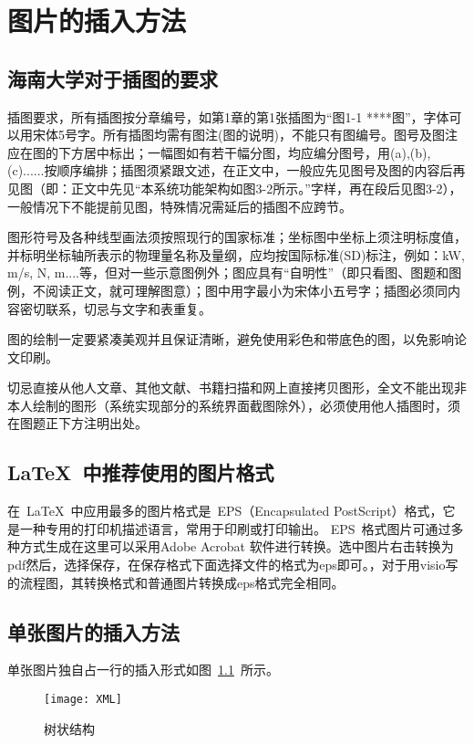 
\chapter{图片的插入方法}

\section{海南大学对于插图的要求}

 \par{插图要求，所有插图按分章编号，如第1章的第1张插图为“图1-1 ****图”，字体可以用宋体5号字。所有插图均需有图注(图的说明)，不能只有图编号。图号及图注应在图的下方居中标出；一幅图如有若干幅分图，均应编分图号，用(a),(b),(c)......按顺序编排；插图须紧跟文述，在正文中，一般应先见图号及图的内容后再见图（即：正文中先见“本系统功能架构如图3-2所示。”字样，再在段后见图3-2），一般情况下不能提前见图，特殊情况需延后的插图不应跨节。}
\par{图形符号及各种线型画法须按照现行的国家标准；坐标图中坐标上须注明标度值，并标明坐标轴所表示的物理量名称及量纲，应均按国际标准(SD)标注，例如：kW,  m/s, N, m....等，但对一些示意图例外；图应具有“自明性”（即只看图、图题和图例，不阅读正文，就可理解图意）；图中用字最小为宋体小五号字；插图必须同内容密切联系，切忌与文字和表重复。}
\par{图的绘制一定要紧凑美观并且保证清晰，避免使用彩色和带底色的图，以免影响论文印刷。}
\par{切忌直接从他人文章、其他文献、书籍扫描和网上直接拷贝图形，全文不能出现非本人绘制的图形（系统实现部分的系统界面截图除外），必须使用他人插图时，须在图题正下方注明出处。
}

\section{\LaTeX~中推荐使用的图片格式}

在~\LaTeX~中应用最多的图片格式是~EPS（Encapsulated PostScript）格式，它是一种专用的打印机描述语言，常用于印刷或打印输出。
EPS~格式图片可通过多种方式生成在这里可以采用Adobe Acrobat 软件进行转换。选中图片右击转换为pdf然后，选择保存，在保存格式下面选择文件的格式为eps即可。，对于用visio写的流程图，其转换格式和普通图片转换成eps格式完全相同。

\section{单张图片的插入方法}
单张图片独自占一行的插入形式如图~\ref{fig:xml}~所示。
\begin{figure}[htbp]
\centering
\texttt{[image: XML]}
\caption{树状结构}\label{fig:xml}
\vspace{\baselineskip}
\end{figure}


